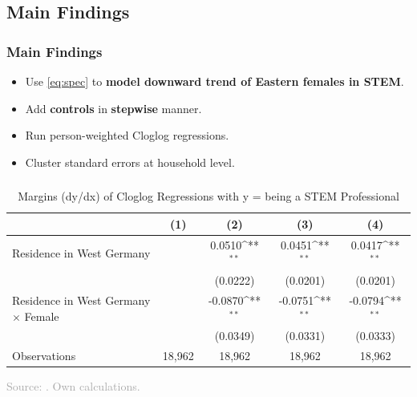 \documentclass[11pt, aspectratio=1610, xcolor={dvipsnames}]{beamer}
\newcommand{\highlight}[1]{\textbf{\textcolor{PineGreen}{#1}}}
\def\sym#1{\ifmmode^{#1}\else\(^{#1}\)\fi}
\begin{document}
	\subsection{Main Findings}
	\begin{frame}
		\frametitle{Main Findings}
		
		\begin{itemize}
			\item Use \eqref{eq:spec} to \highlight{model downward trend of Eastern females in STEM}.
			\item Add \highlight{controls} in \highlight{stepwise} manner.
			\item Run person-weighted Cloglog regressions.
			\item Cluster standard errors at household level.
		\end{itemize}
		
	\end{frame}
	
	\begin{frame}
		\frametitle{}
		
		{\linespread{1}\tiny
			\begin{table}[h]
				\centering
				\caption{Margins (dy/dx) of Cloglog Regressions with y = being a STEM Professional}
				\label{tab:margins1}
				\begin{tabular}{p{25em}*{4}{c}}
					\toprule
					&\multicolumn{1}{c}{(1)}         &\multicolumn{1}{c}{(2)}         &\multicolumn{1}{c}{(3)}         &\multicolumn{1}{c}{(4)}         \\
					\midrule
					Residence in West Germany&                     &      0.0510\sym{**} &      0.0451\sym{**} &      0.0417\sym{**} \\
					&                     &    (0.0222)         &    (0.0201)         &    (0.0201)         \\
					\addlinespace
					Residence in West Germany $\times$ Female&                     &     -0.0870\sym{**} &     -0.0751\sym{**} &     -0.0794\sym{**} \\
					&                     &    (0.0349)         &    (0.0331)         &    (0.0333)         \\
					\midrule
					Observations        &       18,962         &       18,962         &       18,962         &       18,962         \\
					\bottomrule
				\end{tabular}
			\end{table}
		}
		
		{\scriptsize
			\textcolor{darkgray}{Source: \cite{SOEP2023}. Own calculations.}
		}
		
	\end{frame}
	
\end{document}
